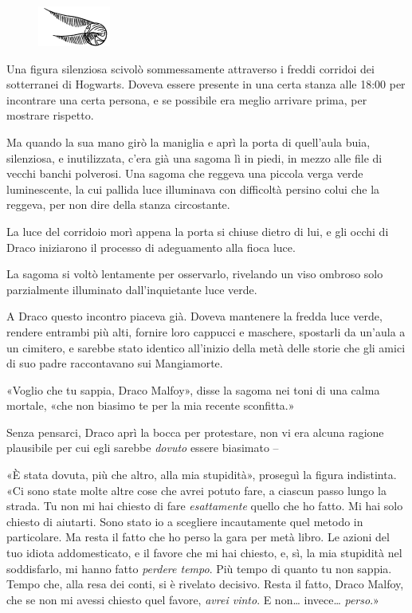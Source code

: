 \begin{figure}[h!]
        \includegraphics[scale=0.4]{boccino.png}
        \centering
\end{figure}

Una figura silenziosa scivolò sommessamente attraverso i freddi corridoi dei sotterranei di Hogwarts. Doveva essere presente in una certa stanza alle 18:00 per incontrare una certa persona, e se possibile era meglio arrivare prima, per mostrare rispetto.

Ma quando la sua mano girò la maniglia e aprì la porta di quell’aula buia, silenziosa, e inutilizzata, c’era già una sagoma lì in piedi, in mezzo alle file di vecchi banchi polverosi. Una sagoma che reggeva una piccola verga verde luminescente, la cui pallida luce illuminava con difficoltà persino colui che la reggeva, per non dire della stanza circostante.

La luce del corridoio morì appena la porta si chiuse dietro di lui, e gli occhi di Draco iniziarono il processo di adeguamento alla fioca luce.

La sagoma si voltò lentamente per osservarlo, rivelando un viso ombroso solo parzialmente illuminato dall’inquietante luce verde.

A Draco questo incontro piaceva già. Doveva mantenere la fredda luce verde, rendere entrambi più alti, fornire loro cappucci e maschere, spostarli da un’aula a un cimitero, e sarebbe stato identico all’inizio della metà delle storie che gli amici di suo padre raccontavano sui Mangiamorte.

«Voglio che tu sappia, Draco Malfoy», disse la sagoma nei toni di una calma mortale, «che non biasimo te per la mia recente sconfitta.»

Senza pensarci, Draco aprì la bocca per protestare, non vi era alcuna ragione plausibile per cui egli sarebbe \textit{dovuto} essere biasimato –

«È stata dovuta, più che altro, alla mia stupidità», proseguì la figura indistinta. «Ci sono state molte altre cose che avrei potuto fare, a ciascun passo lungo la strada. Tu non mi hai chiesto di fare \textit{esattamente} quello che ho fatto. Mi hai solo chiesto di aiutarti. Sono stato io a scegliere incautamente quel metodo in particolare. Ma resta il fatto che ho perso la gara per metà libro. Le azioni del tuo idiota addomesticato, e il favore che mi hai chiesto, e, sì, la mia stupidità nel soddisfarlo, mi hanno fatto \textit{perdere tempo}. Più tempo di quanto tu non sappia. Tempo che, alla resa dei conti, si è rivelato decisivo. Resta il fatto, Draco Malfoy, che se non mi avessi chiesto quel favore, \textit{avrei vinto}. E non… invece… \textit{perso}.»

